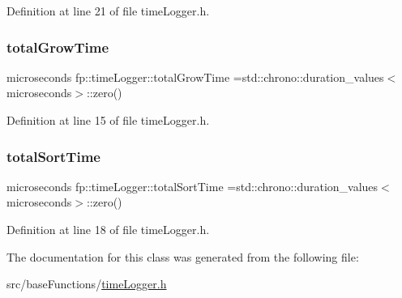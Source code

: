 Definition at line 21 of file time\+Logger.\+h.

\mbox{\label{classfp_1_1timeLogger_ae79b7283b8f150e851fc325c29618ba1}} 
\subsubsection{\texorpdfstring{total\+Grow\+Time}{totalGrowTime}}
{\footnotesize\ttfamily microseconds fp\+::time\+Logger\+::total\+Grow\+Time =std\+::chrono\+::duration\+\_\+values$<$microseconds$>$\+::zero()\hspace{0.3cm}{\ttfamily [static]}}



Definition at line 15 of file time\+Logger.\+h.

\mbox{\label{classfp_1_1timeLogger_a3ac30f8dba0551c3cd3f57dc4806e56e}} 
\subsubsection{\texorpdfstring{total\+Sort\+Time}{totalSortTime}}
{\footnotesize\ttfamily microseconds fp\+::time\+Logger\+::total\+Sort\+Time =std\+::chrono\+::duration\+\_\+values$<$microseconds$>$\+::zero()\hspace{0.3cm}{\ttfamily [static]}}



Definition at line 18 of file time\+Logger.\+h.



The documentation for this class was generated from the following file\+:\begin{DoxyCompactItemize}
\item 
src/base\+Functions/\hyperlink{timeLogger_8h}{time\+Logger.\+h}\end{DoxyCompactItemize}
